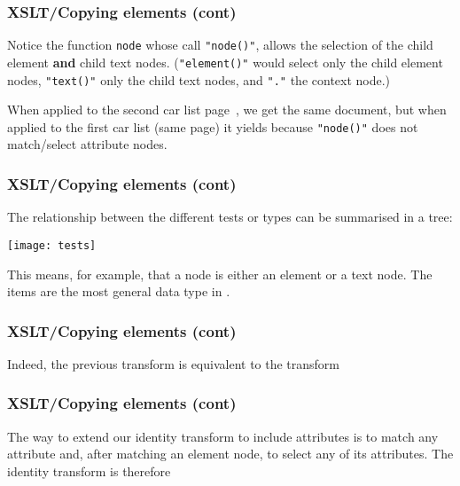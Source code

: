 %
\begin{frame}[containsverbatim]
\frametitle{XSLT/Copying elements (cont)}

Notice the function \texttt{node} whose call \verb|"node()"|, allows
the selection of the child element \textbf{and} child text
nodes. (\verb|"element()"| would select only the child element nodes,
\verb|"text()"| only the child text nodes, and \verb|"."| the context
node.)

\bigskip

When applied to the second car list page~\pageref{cars}, we get the
same document, but when applied to the first car list (same page) it
yields  because \verb|"node()"| does
not match/select attribute nodes.

\end{frame}

%
\begin{frame} 
\frametitle{XSLT/Copying elements (cont)}

The relationship between the different tests or types can be
summarised in a tree:
\begin{center}
\texttt{[image: tests]}
\end{center}
This means, for example, that a node is either an element or a text
node. The items are the most general data type in \XSLT.

\end{frame}

%
\begin{frame} 
\frametitle{XSLT/Copying elements (cont)}

Indeed, the previous transform is equivalent to the transform

\end{frame}

%
\begin{frame} 
\frametitle{XSLT/Copying elements (cont)}

The way to extend our identity transform to include attributes is to
match any attribute and, after matching an element node, to select any
of its attributes. The identity transform is therefore

\end{frame}

